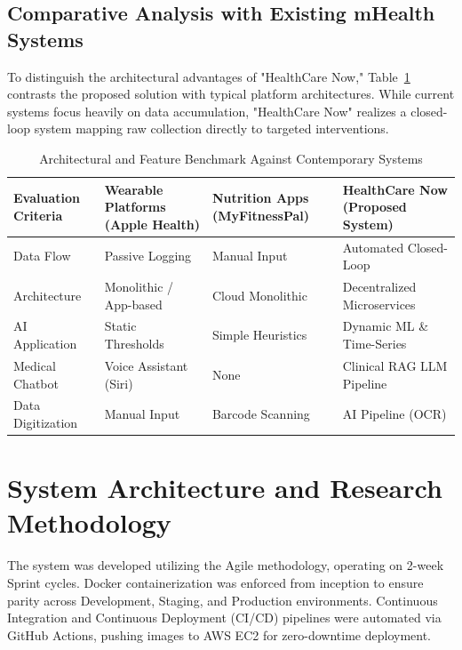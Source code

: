 \documentclass[journal, a4paper]{IEEEtran}
\begin{document}
\subsection{Comparative Analysis with Existing mHealth Systems}
To distinguish the architectural advantages of "HealthCare Now," Table~\ref{tab:mhealth_comparison} contrasts the proposed solution with typical platform architectures. While current systems focus heavily on data accumulation, "HealthCare Now" realizes a closed-loop system mapping raw collection directly to targeted interventions.

\begin{table}[htbp]
\caption{Architectural and Feature Benchmark Against Contemporary Systems}
\label{tab:mhealth_comparison}
\begin{center}
\begin{tabularx}{\columnwidth}{|X|X|X|X|}
\hline
\textbf{Evaluation Criteria} & \textbf{Wearable Platforms (Apple Health)} & \textbf{Nutrition Apps (MyFitnessPal)} & \textbf{HealthCare Now (Proposed System)} \\
\hline
Data Flow & Passive Logging & Manual Input & Automated Closed-Loop \\
\hline
Architecture & Monolithic / App-based & Cloud Monolithic & Decentralized Microservices \\
\hline
AI Application & Static Thresholds & Simple Heuristics & Dynamic ML \& Time-Series \\
\hline
Medical Chatbot & Voice Assistant (Siri) & None & Clinical RAG LLM Pipeline \\
\hline
Data Digitization & Manual Input & Barcode Scanning & AI Pipeline (OCR) \\
\hline
\end{tabularx}
\end{center}
\end{table}

\section{System Architecture and Research Methodology}
\label{sec:architecture}

The system was developed utilizing the Agile methodology, operating on 2-week Sprint cycles. Docker containerization was enforced from inception to ensure parity across Development, Staging, and Production environments. Continuous Integration and Continuous Deployment (CI/CD) pipelines were automated via GitHub Actions, pushing images to AWS EC2 for zero-downtime deployment.
\end{document}
